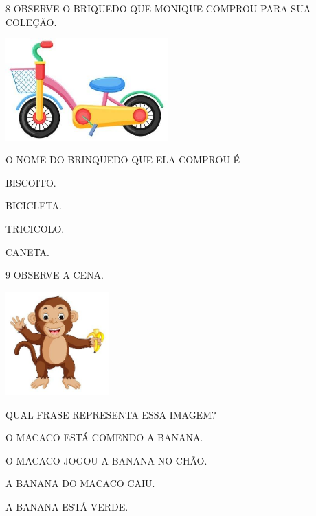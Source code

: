 \num{8} OBSERVE O BRIQUEDO QUE MONIQUE COMPROU PARA SUA COLEÇÃO.

\includegraphics[width=2.45625in,height=1.54583in]{media/image217.jpg}


O NOME DO BRINQUEDO QUE ELA COMPROU É

\begin{escolha}
\item BISCOITO.

\item BICICLETA.

\item TRICICOLO.

\item CANETA.
\end{escolha}


\num{9} OBSERVE A CENA.

\includegraphics[width=1.57569in,height=1.57569in]{media/image218.jpg}

QUAL FRASE REPRESENTA ESSA IMAGEM?

\begin{escolha}
\item O MACACO ESTÁ COMENDO A BANANA.

\item O MACACO JOGOU A BANANA NO CHÃO.

\item A BANANA DO MACACO CAIU.

\item A BANANA ESTÁ VERDE.
\end{escolha}

